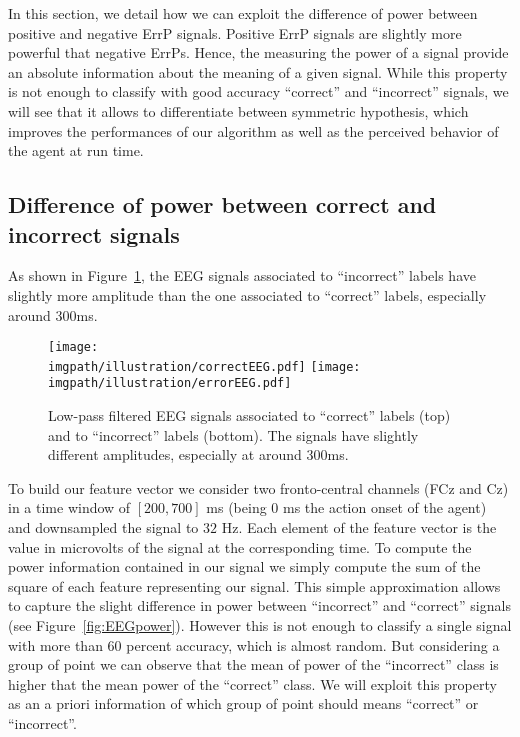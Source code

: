 In this section, we detail how we can exploit the difference of power between positive and negative ErrP signals. Positive ErrP signals are slightly more powerful that negative ErrPs. Hence, the measuring the power of a signal provide an absolute information about the meaning of a given signal. While this property is not enough to classify with good accuracy ``correct'' and ``incorrect'' signals, we will see that it allows to differentiate between symmetric hypothesis, which improves the performances of our algorithm as well as the perceived behavior of the agent at run time.

\subsection{Difference of power between correct and incorrect signals}

As shown in Figure~\ref{fig:EEGsample}, the EEG signals associated to ``incorrect'' labels have slightly more amplitude than the one associated to ``correct'' labels, especially around 300ms. 

\begin{figure}[!htbp]
\centering
\texttt{[image: \\imgpath/illustration/correctEEG.pdf]}
\texttt{[image: \\imgpath/illustration/errorEEG.pdf]}
\caption{Low-pass filtered EEG signals associated to ``correct'' labels (top) and to ``incorrect'' labels (bottom).  The signals have slightly different amplitudes, especially at around 300ms. }
\label{fig:EEGsample}
\end{figure}

To build our feature vector we consider two fronto-central channels (FCz and Cz) in a time window of $[200,700]$ ms (being 0 ms the action onset of the agent) and downsampled the signal to $32$ Hz. Each element of the feature vector is the value in microvolts of the signal at the corresponding time. To compute the power information contained in our signal we simply compute the sum of the square of each feature representing our signal. This simple approximation allows to capture the slight difference in power between ``incorrect'' and ``correct'' signals (see Figure~\ref{fig:EEGpower}). However this is not enough to classify a single signal with more than 60 percent accuracy, which is almost random. But considering a group of point we can observe that the mean of power of the ``incorrect'' class is higher that the mean power of the ``correct'' class. We will exploit this property as an a priori information of which group of point should means ``correct'' or ``incorrect''.

